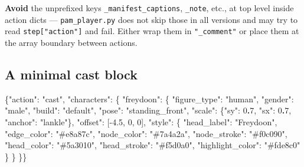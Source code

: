 \documentclass[
  12pt,
  letterpaper,
]{book}
\newenvironment{Shaded}{}{}
\newcommand{\DataTypeTok}[1]{\textcolor[rgb]{0.56,0.13,0.00}{#1}}
\newcommand{\DecValTok}[1]{\textcolor[rgb]{0.25,0.63,0.44}{#1}}
\newcommand{\ErrorTok}[1]{\textcolor[rgb]{1.00,0.00,0.00}{\textbf{#1}}}
\newcommand{\FloatTok}[1]{\textcolor[rgb]{0.25,0.63,0.44}{#1}}
\newcommand{\FunctionTok}[1]{\textcolor[rgb]{0.02,0.16,0.49}{#1}}
\newcommand{\OtherTok}[1]{\textcolor[rgb]{0.00,0.44,0.13}{#1}}
\newcommand{\StringTok}[1]{\textcolor[rgb]{0.25,0.44,0.63}{#1}}
\begin{document}
\textbf{Avoid} the unprefixed keys \texttt{\_manifest\_captions},
\texttt{\_note}, etc., at top level inside action dicts ---
\texttt{pam\_player.py} does not skip those in all versions and may try
to read \texttt{step{[}"action"{]}} and fail. Either wrap them in
\texttt{"\_comment"} or place them at the array boundary between
actions.

\subsection{A minimal cast block}\label{a-minimal-cast-block}

\begin{Shaded}
\begin{Highlighting}[]
\FunctionTok{\{}\DataTypeTok{"action"}\FunctionTok{:} \StringTok{"cast"}\FunctionTok{,} \DataTypeTok{"characters"}\FunctionTok{:} \FunctionTok{\{}
  \DataTypeTok{"freydoon"}\FunctionTok{:} \FunctionTok{\{}
    \DataTypeTok{"figure\_type"}\FunctionTok{:} \StringTok{"human"}\FunctionTok{,}
    \DataTypeTok{"gender"}\FunctionTok{:}      \StringTok{"male"}\FunctionTok{,}
    \DataTypeTok{"build"}\FunctionTok{:}       \StringTok{"default"}\FunctionTok{,}
    \DataTypeTok{"pose"}\FunctionTok{:}        \StringTok{"standing\_front"}\FunctionTok{,}
    \DataTypeTok{"scale"}\FunctionTok{:}       \FunctionTok{\{}\DataTypeTok{"sy"}\FunctionTok{:} \DecValTok{0}\ErrorTok{.}\DecValTok{7}\FunctionTok{,} \DataTypeTok{"sx"}\FunctionTok{:} \DecValTok{0}\ErrorTok{.}\DecValTok{7}\FunctionTok{,} \DataTypeTok{"anchor"}\FunctionTok{:} \StringTok{"lankle"}\FunctionTok{\},}
    \DataTypeTok{"offset"}\FunctionTok{:}      \OtherTok{[}\FloatTok{{-}4.5}\OtherTok{,} \DecValTok{0}\OtherTok{,} \DecValTok{0}\OtherTok{]}\FunctionTok{,}
    \DataTypeTok{"style"}\FunctionTok{:} \FunctionTok{\{}
      \DataTypeTok{"head\_label"}\FunctionTok{:}   \StringTok{"Freydoon"}\FunctionTok{,}
      \DataTypeTok{"edge\_color"}\FunctionTok{:}   \StringTok{"\#e8a87c"}\FunctionTok{,}
      \DataTypeTok{"node\_color"}\FunctionTok{:}   \StringTok{"\#7a4a2a"}\FunctionTok{,}
      \DataTypeTok{"node\_stroke"}\FunctionTok{:}  \StringTok{"\#f0c090"}\FunctionTok{,}
      \DataTypeTok{"head\_color"}\FunctionTok{:}   \StringTok{"\#5a3010"}\FunctionTok{,}
      \DataTypeTok{"head\_stroke"}\FunctionTok{:}  \StringTok{"\#f5d0a0"}\FunctionTok{,}
      \DataTypeTok{"highlight\_color"}\FunctionTok{:} \StringTok{"\#fde8c0"}
    \FunctionTok{\}}
  \FunctionTok{\}}
\FunctionTok{\}\}}
\end{Highlighting}
\end{Shaded}
\end{document}
